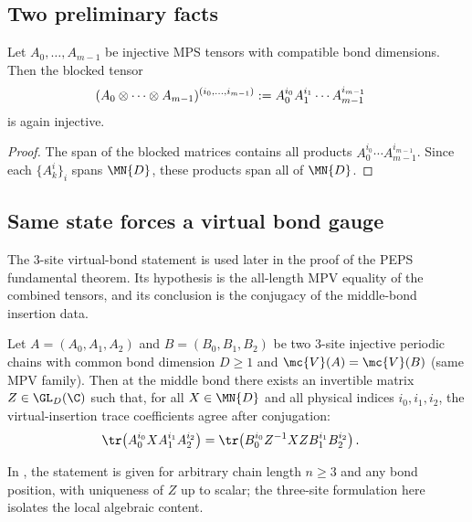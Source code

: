 \subsection{Two preliminary facts}
\label{sec:intermediate}

\begin{lemma}\label{lem:blocking_preserves_injectivity}
    \leanok
    Let $A_0,\ldots,A_{m-1}$ be injective MPS tensors with compatible
    bond dimensions.
    Then the blocked tensor
    \begin{align}
        (A_0\otimes\cdots\otimes A_{m-1})^{(i_0,\ldots,i_{m-1})}
         & :=A_0^{i_0}A_1^{i_1}\cdots A_{m-1}^{i_{m-1}}
        \notag
    \end{align}
    is again injective.
\end{lemma}

\begin{proof}
    \leanok
    The span of the blocked matrices contains all products
    $A_0^{i_0}\cdots A_{m-1}^{i_{m-1}}$.
    Since each $\{A_k^i\}_i$ spans $\MN{D}$, these products span
    all of $\MN{D}$.
\end{proof}

\subsection{Same state forces a virtual bond gauge}

The 3-site virtual-bond statement is used later in the proof of the PEPS
fundamental theorem. Its hypothesis is the all-length MPV equality of the
combined tensors, and its conclusion is the conjugacy of the middle-bond
insertion data.

\begin{lemma}%
    \label{lem:virtual_bond_gauge}
    \leanok
    Let $A=(A_0,A_1,A_2)$ and $B=(B_0,B_1,B_2)$ be two
    3-site injective periodic chains with common bond dimension
    $D\ge1$ and $\mc{V}(A)=\mc{V}(B)$ (same MPV family).
    Then at the middle bond there exists an invertible matrix
    $Z\in\GL_D(\C)$ such that, for all $X\in\MN{D}$ and all physical
    indices $i_0,i_1,i_2$, the virtual-insertion trace coefficients agree
    after conjugation:
    \begin{align}
        \tr\!\left(A_0^{i_0}X A_1^{i_1}A_2^{i_2}\right)
         & =\tr\!\left(B_0^{i_0}Z^{-1}XZ B_1^{i_1}B_2^{i_2}\right).
        \notag
    \end{align}

    In \cite[Lemma~1]{Molnar2018NormalPEPS}, the statement is given for
    arbitrary chain length $n\ge3$ and any bond position, with
    uniqueness of $Z$ up to scalar; the three-site formulation here isolates
    the local algebraic content.
\end{lemma}

